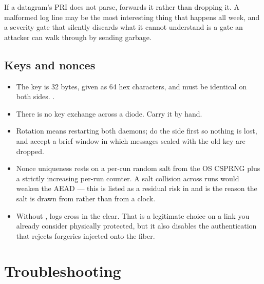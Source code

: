 \documentclass[11pt,a4paper]{article}
\renewcommand{\amp}{\prog{ld\_amp}}
\begin{document}
\begin{notebox}
If a datagram's PRI does not parse, \amp{} forwards it rather than dropping
it. A malformed log line may be the most interesting thing that happens all
week, and a severity gate that silently discards what it cannot understand is
a gate an attacker can walk through by sending garbage.
\end{notebox}

\subsection{Keys and nonces}

\begin{itemize}
\item The key is 32 bytes, given as 64 hex characters, and must be identical
      on both sides. .
\item There is no key exchange across a diode. Carry it by hand.
\item Rotation means restarting both daemons; do the \dstside{} side first so
      nothing is lost, and accept a brief window in which messages sealed with
      the old key are dropped.
\item Nonce uniqueness rests on a per-run random salt from the OS CSPRNG plus
      a strictly increasing per-run counter. A salt collision across runs
      would weaken the AEAD --- this is listed as a residual risk in
       and is the reason the salt is drawn from
       rather than from a clock.
\item Without , logs cross in the clear. That is a legitimate
      choice on a link you already consider physically protected, but it
      also disables the authentication that rejects forgeries injected onto
      the fiber.
\end{itemize}

\section{Troubleshooting}
\end{document}
